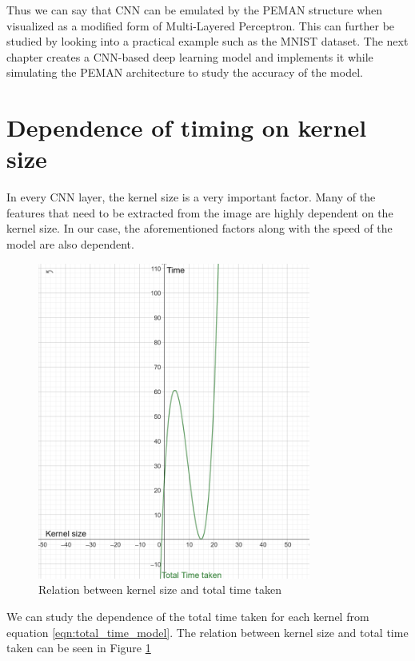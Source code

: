 \documentclass[wide]{adonis}
\begin{document}
Thus we can say that CNN can be emulated by the PEMAN structure when visualized as a modified form of Multi-Layered Perceptron. This can further be studied by looking into a practical example such as the MNIST dataset. The next chapter creates a CNN-based deep learning model and implements it while simulating the PEMAN architecture to study the accuracy of the model.

\section{Dependence of timing on kernel size}

In every CNN layer, the kernel size is a very important factor. Many of the features that need to be extracted from the image are highly dependent on the kernel size. In our case, the aforementioned factors along with the speed of the model are also dependent.

\begin{figure}
	\centering
	\includegraphics[width=0.8\textwidth]{images/kernel_time.png}
	\caption{Relation between kernel size and total time taken}
	\label{fig:kernel_time}
\end{figure}

We can study the dependence of the total time taken for each kernel from equation \ref{eqn:total_time_model}. The relation between kernel size and total time taken can be seen in Figure \ref{fig:kernel_time}
\end{document}
